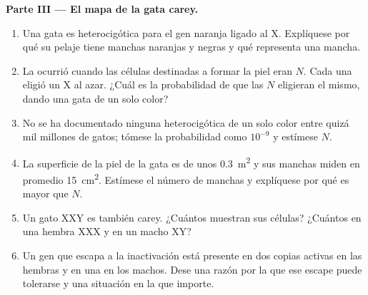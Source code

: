 \begin{problem}
\medskip
\noindent\textbf{Parte III --- El mapa de la gata carey.}
\begin{enumerate}[resume]
  \item Una gata es heterocigótica para el gen naranja ligado al X.
        Explíquese por qué su pelaje tiene manchas naranjas y negras y
        qué representa una mancha.
  \item La  ocurrió cuando las células destinadas a
        formar la piel eran $N$. Cada una eligió un X al azar. ¿Cuál es
        la probabilidad de que las $N$ eligieran el mismo, dando una gata
        de un solo color?
  \item No se ha documentado ninguna heterocigótica de un solo color
        entre quizá mil millones de gatos; tómese la probabilidad como
        $10^{-9}$ y estímese $N$.
  \item La superficie de la piel de la gata es de unos \qty{0.3}{m^2} y
        sus manchas miden en promedio \qty{15}{cm^2}. Estímese el número
        de manchas y explíquese por qué es mayor que $N$.
  \item Un gato XXY es también carey. ¿Cuántos 
        muestran sus células? ¿Cuántos en una hembra XXX y en un macho
        XY?
  \item Un gen que escapa a la inactivación está presente en dos copias
        activas en las hembras y en una en los machos. Dese una razón por
        la que ese escape puede tolerarse y una situación en la que
        importe.
\end{enumerate}


\end{problem}
